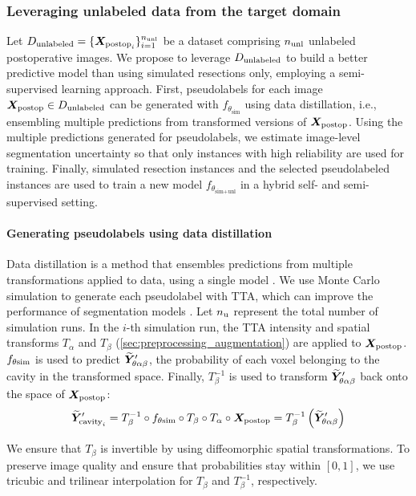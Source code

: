 \subsubsection{Leveraging unlabeled data from the target domain}
\label{sec:leveraging_semi}

Let $D_{\textnormal{unlabeled}} = \{ \bm{X}_{\text{postop}_i} \}_{i = 1}^{n_{\textnormal{unl}}}$ be a dataset comprising $n_{\textnormal{unl}}$ unlabeled postoperative images.
We propose to leverage $D_{\textnormal{unlabeled}}$ to build a better predictive model than using simulated resections only, employing a semi-supervised learning approach.
First, pseudolabels for each image $\bm{X}_{\textnormal{postop}} \in D_{\textnormal{unlabeled}}$ can be generated with $f_{\theta_{\text{sim}}}$ using data distillation, i.e., ensembling multiple predictions from transformed versions of $\bm{X}_{\textnormal{postop}}$.
Using the multiple predictions generated for pseudolabels, we estimate image-level segmentation uncertainty so that only instances with high reliability are used for training.
Finally, simulated resection instances and the selected pseudolabeled instances are used to train a new model $f_{\theta_{\text{sim+unl}}}$ in a hybrid self- and semi-supervised setting.


\paragraph{Generating pseudolabels using data distillation}

Data distillation is a method that ensembles predictions from multiple transformations applied to data, using a single model \cite{radosavovic_data_2017}.
We use Monte Carlo simulation to generate each pseudolabel with \ac{TTA}, which can improve the performance of segmentation models \cite{wang_aleatoric_2019}.
Let $n_{\textnormal{u}}$ represent the total number of simulation runs.
In the $i$-th simulation run,
the \ac{TTA} intensity and spatial transforms $T_\alpha$ and $T_\beta$ (\cref{sec:preprocessing_augmentation}) are applied to $\bm{X}_{\textnormal{postop}}$.
$f_{\theta \text{sim}}$ is used to predict $\widetilde{\bm{Y}}_{\theta\alpha\beta}'$, the probability of each voxel belonging to the cavity in the transformed space.
Finally, $T_\beta^{-1}$ is used to transform $\widetilde{\bm{Y}}_{\theta\alpha\beta}'$ back onto the space of $\bm{X}_{\textnormal{postop}}$:
\begin{equation}
    \widetilde{\bm{Y}}'_{\text{cavity}_i}
    = T_\beta^{-1}
    \circ f_{\theta \text{sim}}
    \circ T_\beta
    \circ T_\alpha
    \circ \bm{X}_{\textnormal{postop}}
    = T_\beta^{-1} \left( \widetilde{\bm{Y}}_{\theta\alpha\beta}' \right)
\end{equation}

We ensure that $T_\beta$ is invertible by using diffeomorphic spatial transformations.
To preserve image quality and ensure that probabilities stay within $[0, 1]$, we use tricubic and trilinear interpolation for $T_\beta$ and $T_\beta^{-1}$, respectively.

